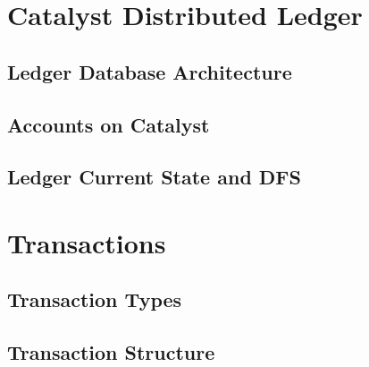 \documentclass[a4paper, 12pt]{book}
\begin{document}

\chapter{Catalyst Distributed Ledger} \label{Cha:LDA}


\section{Ledger Database Architecture} \label{Sec:LDA}



\section{Accounts on Catalyst} \label{Sec:AoC}



\section{Ledger Current State and DFS}\label{Sec:DFS}




\chapter{Transactions} \label{Cha:Tra}




\section{Transaction Types} \label{Sec:Typ}



\section{Transaction Structure} \label{Sec:TStru}


\end{document}
